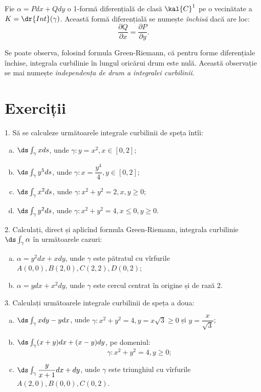 Fie $ \alpha = Pdx + Qdy $ o 1-formă diferențială de clasă $ \kal{C}^1 $ pe o
vecinătate a $ K = \dr{Int}(\gamma) $. Această formă diferențială se numește
\emph{închisă} dacă are loc:
\[
  \frac{\partial Q}{\partial x} = \frac{\partial P}{\partial y}.
\]

Se poate observa, folosind formula Green-Riemann, că pentru forme diferențiale
închise, integrala curbilinie în lungul oricărui drum este nulă. Această observație
se mai numește \emph{independența de drum a integralei curbilinii}.


\section{Exerciții}

1. Să se calculeze următoarele integrale curbilinii de speța întîi:
\begin{enumerate}[(a)]
\item $ \ds\int_\gamma xds $, unde $ \gamma : y = x^2, x \in [0, 2] $;
\item $ \ds\int_\gamma y^5ds $, unde $ \gamma : x = \dfrac{y^4}{4}, y \in [0, 2] $;
\item $ \ds\int_\gamma x^2ds $, unde $ \gamma: x^2 + y^2 = 2, x, y \geq 0 $;
\item $ \ds\int_\gamma y^2ds $, unde $ \gamma: x^2 + y^2 = 4, x \leq 0, y \geq 0 $.
\end{enumerate}

\vspace{1cm}

2. Calculați, direct și aplicînd formula Green-Riemann, integrala curbilinie
$ \ds\int_\gamma \alpha $ în următoarele cazuri:
\begin{enumerate}[(a)]
\item $ \alpha = y^2 dx + x dy $, unde $ \gamma $ este pătratul cu vîrfurile
  $ A(0,0), B(2, 0), C(2, 2), D(0, 2) $;
\item $ \alpha = ydx + x^2 dy $, unde $ \gamma $ este cercul centrat în origine
  și de rază $ 2 $.
\end{enumerate}

\vspace{1cm}

3. Calculați următoarele integrale curbilinii de speța a doua:
\begin{enumerate}[(a)]
\item $ \ds\int_\gamma xdy - ydx $, unde $ \gamma: x^2 + y^2 = 4, y = x\sqrt{3} \geq 0 $
  și $ y = \dfrac{x}{\sqrt{3}} $;
\item $ \ds\int_\gamma (x + y) dx + (x - y) dy $, pe domeniul:
  \[
    \gamma: x^2 + y^2 = 4, y \geq 0;
  \]
\item $ \ds\int_\gamma \dfrac{y}{x + 1} dx + dy $, unde $ \gamma $ este
  triunghiul cu vîrfurile $ A(2, 0), B(0, 0), C(0, 2) $.
\end{enumerate}


